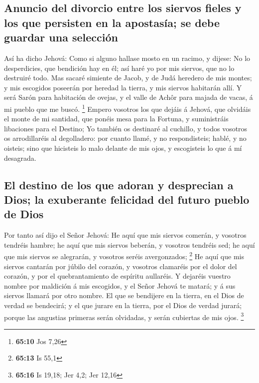 \hypertarget{anuncio-del-divorcio-entre-los-siervos-fieles-y-los-que-persisten-en-la-apostasuxeda-se-debe-guardar-una-selecciuxf3n}{%
\subsection{Anuncio del divorcio entre los siervos fieles y los que
persisten en la apostasía; se debe guardar una
selección}\label{anuncio-del-divorcio-entre-los-siervos-fieles-y-los-que-persisten-en-la-apostasuxeda-se-debe-guardar-una-selecciuxf3n}}

 Así ha dicho Jehová: Como si alguno hallase mosto en un
racimo, y dijese: No lo desperdicies, que bendición hay en él; así haré
yo por mis siervos, que no lo destruiré todo.  Mas sacaré
simiente de Jacob, y de Judá heredero de mis montes; y mis escogidos
poseerán por heredad la tierra, y mis siervos habitarán allí.
 Y será Sarón para habitación de ovejas, y el valle de
Achôr para majada de vacas, á mi pueblo que me buscó. \footnote{\textbf{65:10}
  Jos 7,26}  Empero vosotros los que dejáis á Jehová, que
olvidáis el monte de mi santidad, que ponéis mesa para la Fortuna, y
suministráis libaciones para el Destino;  Yo también os
destinaré al cuchillo, y todos vosotros os arrodillaréis al degolladero:
por cuanto llamé, y no respondisteis; hablé, y no oisteis; sino que
hicisteis lo malo delante de mis ojos, y escogisteis lo que á mí
desagrada.

\hypertarget{el-destino-de-los-que-adoran-y-desprecian-a-dios-la-exuberante-felicidad-del-futuro-pueblo-de-dios}{%
\subsection{El destino de los que adoran y desprecian a Dios; la
exuberante felicidad del futuro pueblo de
Dios}\label{el-destino-de-los-que-adoran-y-desprecian-a-dios-la-exuberante-felicidad-del-futuro-pueblo-de-dios}}

 Por tanto así dijo el Señor Jehová: He aquí que mis
siervos comerán, y vosotros tendréis hambre; he aquí que mis siervos
beberán, y vosotros tendréis sed; he aquí que mis siervos se alegrarán,
y vosotros seréis avergonzados; \footnote{\textbf{65:13} Is 55,1}
 He aquí que mis siervos cantarán por júbilo del corazón, y
vosotros clamaréis por el dolor del corazón, y por el quebrantamiento de
espíritu aullaréis.  Y dejaréis vuestro nombre por
maldición á mis escogidos, y el Señor Jehová te matará; y á sus siervos
llamará por otro nombre.  El que se bendijere en la tierra,
en el Dios de verdad se bendecirá; y el que jurare en la tierra, por el
Dios de verdad jurará; porque las angustias primeras serán olvidadas, y
serán cubiertas de mis ojos. \footnote{\textbf{65:16} Is 19,18; Jer 4,2;
  Jer 12,16}

